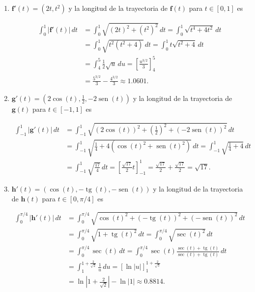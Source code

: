 \documentclass[
  a4paper,
]{scrreport}
\theoremstyle{definition}
\theoremstyle{remark}
\begin{document}
\begin{tcolorbox}[enhanced jigsaw, left=2mm, coltitle=black, colbacktitle=quarto-callout-tip-color!10!white, opacitybacktitle=0.6, colback=white, breakable, titlerule=0mm, toptitle=1mm, rightrule=.15mm, bottomtitle=1mm, bottomrule=.15mm, toprule=.15mm, leftrule=.75mm, arc=.35mm, opacityback=0, title=\textcolor{quarto-callout-tip-color}{\faLightbulb}\hspace{0.5em}{Solución}, colframe=quarto-callout-tip-color-frame]

\begin{enumerate}
\def\labelenumi{\alph{enumi}.}
\item
  \(\mathbf{f}'(t) = (2t, t^2)\) y la longitud de la trayectoria de
  \(\mathbf{f}(t)\) para \(t\in[0,1]\) es

  \begin{align*}
  \int_0^1 |\mathbf{f}'(t)|\,dt 
  &= \int_0^1 \sqrt{(2t)^2+(t^2)^2}\, dt
  = \int_0^1 \sqrt{t^4+4t^2}\, dt \\
  &= \int_0^1 \sqrt{t^2(t^2+4)}\, dt
  = \int_0^1 t\sqrt{t^2+4}\,dt \\
  &= \int_4^5 \frac{1}{2} \sqrt{u}\, du 
  = \left[\frac{u^{3/2}}{3}\right]_4^5 \tag{$u=t^2+4$} \\
  &= \frac{5^{3/2}}{3}-\frac{4^{3/2}}{3}
  \approx 1.0601.
  \end{align*}
\item
  \(\mathbf{g}'(t) = (2\cos(t), \frac{1}{2}, -2\operatorname{sen}(t))\)
  y la longitud de la trayectoria de \(\mathbf{g}(t)\) para
  \(t\in[-1,1]\) es

  \begin{align*}
  \int_{-1}^1 |\mathbf{g}'(t)|\,dt 
  &= \int_{-1}^1 \sqrt{(2\cos(t))^2+\left(\frac{1}{2}\right)^2+(-2\operatorname{sen}(t))^2}\, dt \\
  &= \int_{-1}^1 \sqrt{\frac{1}{4}+4(\cos(t)^2+\operatorname{sen}(t)^2)}\, dt 
  = \int_{-1}^1 \sqrt{\frac{1}{4}+4}\, dt \\
  &= \int_{-1}^1 \sqrt{\frac{17}{4}}\, dt 
  = \left[\frac{\sqrt{17}}{2}t\right]_{-1}^1
  = \frac{\sqrt{17}}{2}+\frac{\sqrt{17}}{2}
  = \sqrt{17}.
  \end{align*}
\item
  \(\mathbf{h}'(t) = (\cos(t), -\operatorname{tg}(t), -\operatorname{sen}(t))\)
  y la longitud de la trayectoria de \(\mathbf{h}(t)\) para
  \(t\in[0,\pi/4]\) es

  \begin{align*}
  \int_0^{\pi/4} |\mathbf{h}'(t)|\,dt 
  &= \int_0^{\pi/4} \sqrt{\cos(t)^2+(-\operatorname{tg}(t))^2+(-\operatorname{sen}(t))^2}\, dt \\
  &= \int_0^{\pi/4} \sqrt{1+\operatorname{tg}(t)^2}\, dt 
  = \int_0^{\pi/4} \sqrt{\sec(t)^2}\, dt \\
  &= \int_0^{\pi/4} \sec(t)\, dt 
  = \int_0^{\pi/4} \sec(t)\frac{\sec(t)+\operatorname{tg}(t)}{\sec(t)+\operatorname{tg}(t)}\, dt \\
  &= \int_{1}^{1+\frac{2}{\sqrt{2}}} \frac{1}{u}\, du 
  = [\ln|u|]_1^{1+\frac{2}{\sqrt{2}}} \tag{1}\\
  &= \ln\left|1+\frac{2}{\sqrt{2}}\right|-\ln|1|
  \approx 0.8814.
  \end{align*}


\end{enumerate}
\end{tcolorbox}
\end{document}
